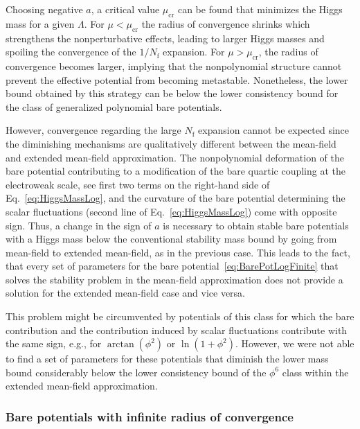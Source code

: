 \documentclass[twocolumn,aps,prd,showpacs,nofootinbib,superscriptaddress,preprintnumbers,floatfix,10pt]{revtex4-1}
\newcommand{\Nf}{N_{\mathrm{f}}}
\begin{document}
Choosing negative $a$, a critical value $\mu_{\mathrm{cr}}$ can be found that minimizes the Higgs mass for a given $\Lambda$. For $\mu < \mu_{\mathrm{cr}}$ the radius of convergence shrinks which strengthens the nonperturbative effects, leading to larger Higgs masses and spoiling the convergence of the $1/\Nf$ expansion. For $\mu > \mu_{\mathrm{cr}}$, the radius of convergence becomes larger, implying that the nonpolynomial structure cannot prevent the effective potential from becoming metastable. 
Nonetheless, the lower bound obtained by this strategy can be below the lower consistency bound for the class of generalized polynomial bare potentials. 


However, convergence regarding the large $\Nf$ expansion cannot be expected since the diminishing mechanisms are qualitatively different between the mean-field and extended mean-field approximation. 
The nonpolynomial deformation of the bare potential contributing to a modification of the bare quartic coupling at the electroweak scale, see first two terms on the right-hand side of Eq.~\eqref{eq:HiggsMassLog}, and the curvature of the bare potential determining the scalar fluctuations (second line of Eq.~\eqref{eq:HiggsMassLog}) come with opposite sign. Thus, a change in the sign of $a$ is necessary to obtain stable bare potentials with a Higgs mass below the conventional stability mass bound by going from mean-field to extended mean-field, as in the previous case. 
This leads to the fact, that every set of parameters for the bare potential~\eqref{eq:BarePotLogFinite} that solves the stability problem in the mean-field approximation does not provide a solution for the extended mean-field case and vice versa. 


This problem might be circumvented by potentials of this class for which the bare contribution and the contribution induced by scalar fluctuations contribute with the same sign, e.g., for $\arctan(\phi^{2})$ or $\ln(1+\phi^{2})$. However, we were not able to find a set of parameters for these potentials that diminish the lower mass bound considerably below the lower consistency bound of the $\phi^{6}$ class within the extended mean-field approximation.






\subsubsection{Bare potentials with infinite radius of convergence}
\end{document}
